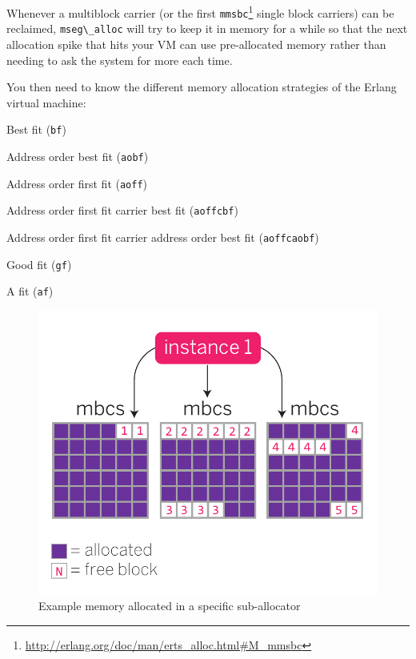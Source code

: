 \documentclass[11pt, oneside]{book}   	%
\newcommand{\term}[1]{\Verb`#1`}
\begin{document}
Whenever a multiblock carrier (or the first \term{mmsbc}\footnote{\href{http://erlang.org/doc/man/erts\_alloc.html\#M\_mmsbc}{http://erlang.org/doc/man/erts\_alloc.html\#M\_mmsbc}} single block carriers) can be reclaimed, \term{mseg\_alloc} will try to keep it in memory for a while so that the next allocation spike that hits your VM can use pre-allocated memory rather than needing to ask the system for more each time.

You then need to know the different memory allocation strategies of the Erlang virtual machine:

\begin{enumerate*}
    \item Best fit (\term{bf})
    \item Address order best fit (\term{aobf})
    \item Address order first fit (\term{aoff})
    \item Address order first fit carrier best fit (\term{aoffcbf})
    \item Address order first fit carrier address order best fit (\term{aoffcaobf})
    \item Good fit (\term{gf})
    \item A fit (\term{af})
\end{enumerate*}

\begin{figure}
  \includegraphics{allocation-strategy-1.pdf}%
  \caption{Example memory allocated in a specific sub-allocator}%
   \label{fig:allocation-strategy-1}
\end{figure}
\end{document}
